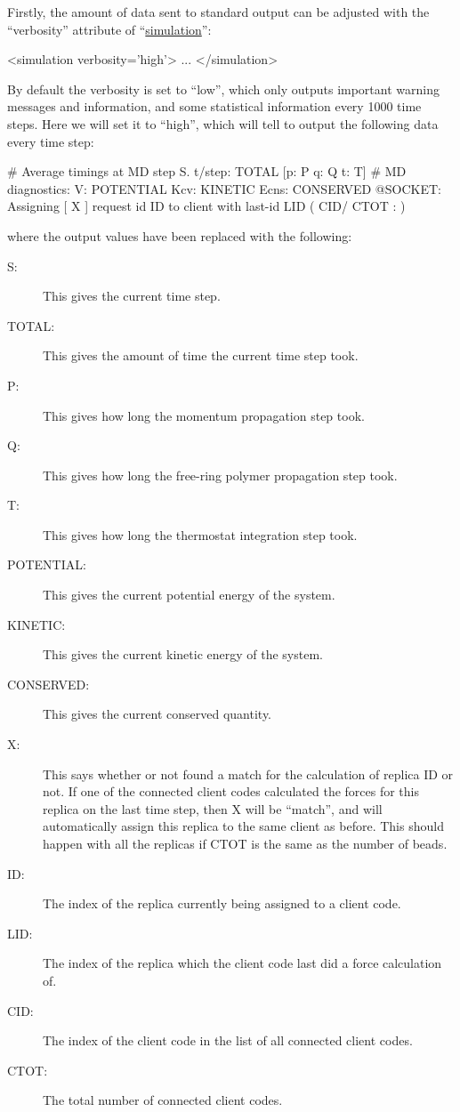 \documentclass[11pt,english,fleqn]{report}
\newenvironment{code}{%
\footnotesize 
\verbatim
}{
\endverbatim
\normalsize
}
\begin{document}
Firstly, the amount of data sent to standard output can be adjusted
with the {}``verbosity'' attribute of 
{}``\hyperref[SIMULATION]{simulation}'':

\begin{code}
<simulation verbosity='high'>
   ...
</simulation>
\end{code}

By default the verbosity is set to {}``low'', which only outputs
important warning messages and information, and some statistical 
information every 1000 time steps. Here we will set it to 
{}``high'', which will 
tell \ipi to output the following data every time step:

\begin{code}
 # Average timings at MD step S. t/step: TOTAL [p: P q: Q t: T]
 # MD diagnostics: V: POTENTIAL Kcv: KINETIC Ecns: CONSERVED
 @SOCKET: Assigning [ X ] request id ID to client with last-id LID ( CID/ CTOT : )
\end{code}
where the output values have been replaced with the following:
\begin{description}
\item [{S:}] This gives the current time step.
\item[{TOTAL:}] This gives the amount of time the current time step took.
\item [{P:}] This gives how long the momentum propagation step took.
\item [{Q:}] This gives how long the free-ring polymer propagation step took.
\item [{T:}] This gives how long the thermostat integration step took.
\item [{POTENTIAL:}] This gives the current potential energy of the system.
\item [{KINETIC:}] This gives the current kinetic energy of the system.
\item [{CONSERVED:}] This gives the current conserved quantity.
\item [{X:}] This says whether or not \ipi found a match for the calculation of 
replica ID or not.
If one of the connected client codes calculated the forces for this replica on the
last time step, then X will be {}``match'', and \ipi will automatically assign
this replica to the same client as before. This should happen with all the replicas
if CTOT is the same as the number of beads.
\item [{ID:}] The index of the replica currently being assigned to a client code.
\item [{LID:}] The index of the replica which the client code last did a force calculation
of.
\item [{CID:}] The index of the client code in the list of all connected client codes.
\item [{CTOT:}] The total number of connected client codes.
\end{description}
\end{document}
